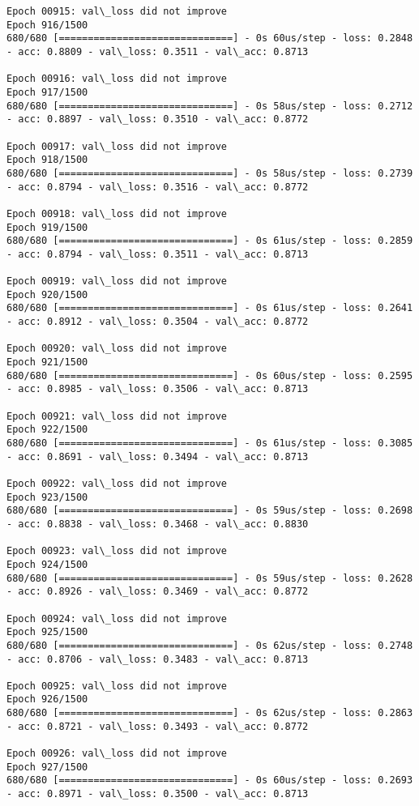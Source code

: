 \documentclass[11pt]{article}
\begin{document}
\begin{Verbatim}[commandchars=\\\{\}]
Epoch 00915: val\_loss did not improve
Epoch 916/1500
680/680 [==============================] - 0s 60us/step - loss: 0.2848 - acc: 0.8809 - val\_loss: 0.3511 - val\_acc: 0.8713

Epoch 00916: val\_loss did not improve
Epoch 917/1500
680/680 [==============================] - 0s 58us/step - loss: 0.2712 - acc: 0.8897 - val\_loss: 0.3510 - val\_acc: 0.8772

Epoch 00917: val\_loss did not improve
Epoch 918/1500
680/680 [==============================] - 0s 58us/step - loss: 0.2739 - acc: 0.8794 - val\_loss: 0.3516 - val\_acc: 0.8772

Epoch 00918: val\_loss did not improve
Epoch 919/1500
680/680 [==============================] - 0s 61us/step - loss: 0.2859 - acc: 0.8794 - val\_loss: 0.3511 - val\_acc: 0.8713

Epoch 00919: val\_loss did not improve
Epoch 920/1500
680/680 [==============================] - 0s 61us/step - loss: 0.2641 - acc: 0.8912 - val\_loss: 0.3504 - val\_acc: 0.8772

Epoch 00920: val\_loss did not improve
Epoch 921/1500
680/680 [==============================] - 0s 60us/step - loss: 0.2595 - acc: 0.8985 - val\_loss: 0.3506 - val\_acc: 0.8713

Epoch 00921: val\_loss did not improve
Epoch 922/1500
680/680 [==============================] - 0s 61us/step - loss: 0.3085 - acc: 0.8691 - val\_loss: 0.3494 - val\_acc: 0.8713

Epoch 00922: val\_loss did not improve
Epoch 923/1500
680/680 [==============================] - 0s 59us/step - loss: 0.2698 - acc: 0.8838 - val\_loss: 0.3468 - val\_acc: 0.8830

Epoch 00923: val\_loss did not improve
Epoch 924/1500
680/680 [==============================] - 0s 59us/step - loss: 0.2628 - acc: 0.8926 - val\_loss: 0.3469 - val\_acc: 0.8772

Epoch 00924: val\_loss did not improve
Epoch 925/1500
680/680 [==============================] - 0s 62us/step - loss: 0.2748 - acc: 0.8706 - val\_loss: 0.3483 - val\_acc: 0.8713

Epoch 00925: val\_loss did not improve
Epoch 926/1500
680/680 [==============================] - 0s 62us/step - loss: 0.2863 - acc: 0.8721 - val\_loss: 0.3493 - val\_acc: 0.8772

Epoch 00926: val\_loss did not improve
Epoch 927/1500
680/680 [==============================] - 0s 60us/step - loss: 0.2693 - acc: 0.8971 - val\_loss: 0.3500 - val\_acc: 0.8713


\end{Verbatim}
\end{document}
